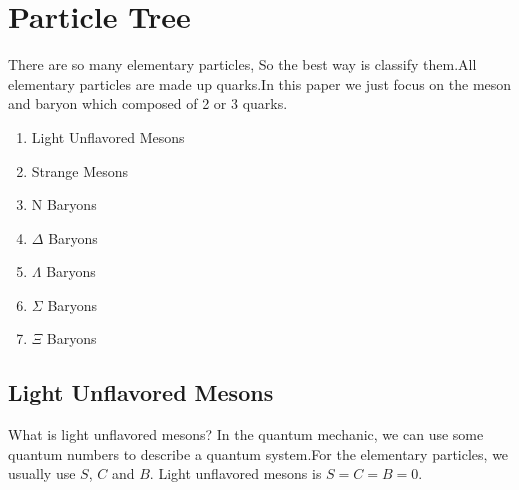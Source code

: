 \documentclass[
10pt, %
a4paper, %
oneside, %
headinclude,footinclude, %
BCOR5mm, %
]{scrartcl}
\begin{document}

\let\thefootnote\relax{}








 

\section{Particle Tree}
There are so many elementary particles, So the best way is classify them.All elementary particles are made up quarks.In this paper we just focus on the meson and baryon which composed of 2 or 3 quarks.

\begin{enumerate}[noitemsep] %
\item Light Unflavored Mesons
\item Strange Mesons
\item N Baryons
\item $\Delta$ Baryons
\item $\Lambda$ Baryons
\item $\Sigma$ Baryons
\item $\Xi$ Baryons
\end{enumerate}


\subsection{Light Unflavored Mesons}
What is light unflavored mesons? In the quantum mechanic, we can use some quantum numbers to describe a quantum system.For the elementary particles, we usually use $S$, $C$ and $B$. Light unflavored mesons is $S=C=B=0$.
\end{document}
